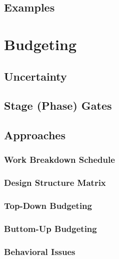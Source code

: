     \section{Examples} %

\chapter{Budgeting} %

    \section{Uncertainty} %

    \section{Stage (Phase) Gates } %

    \section{Approaches} %

        \subsection{Work Breakdown Schedule} %

        \subsection{Design Structure Matrix} %

        \subsection{Top-Down Budgeting} %

        \subsection{Buttom-Up Budgeting} %

        \subsection{Behavioral Issues} %

